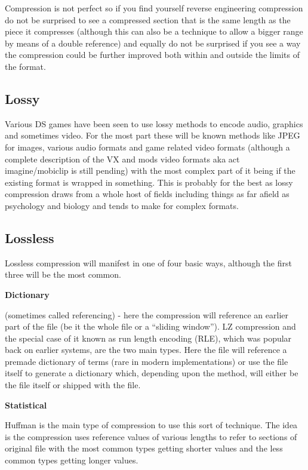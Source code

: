 \documentclass[
]{book}
\begin{document}
Compression is not perfect so if you find yourself reverse engineering compression do not be surprised to see a compressed section that is the same length as the piece it compresses (although this can also be a technique to allow a bigger range by means of a double reference) and equally do not be surprised if you see a way the compression could be further improved both within and outside the limits of the format.

\hypertarget{lossy}{%
\subsection{Lossy}\label{lossy}}

Various DS games have been seen to use lossy methods to encode audio, graphics and sometimes video. For the most part these will be known methods like JPEG for images, various audio formats and game related video formats (although a complete description of the VX and mods video formats aka act imagine/mobiclip is still pending) with the most complex part of it being if the existing format is wrapped in something. This is probably for the best as lossy compression draws from a whole host of fields including things as far afield as psychology and biology and tends to make for complex formats.

\hypertarget{lossless}{%
\subsection{Lossless}\label{lossless}}

Lossless compression will manifest in one of four basic ways, although the first three will be the most common.

\textbf{Dictionary}

(sometimes called referencing) - here the compression will reference an earlier part of the file (be it the whole file or a ``sliding window''). LZ compression and the special case of it known as run length encoding (RLE), which was popular back on earlier systems, are the two main types. Here the file will reference a premade dictionary of terms (rare in modern implementations) or use the file itself to generate a dictionary which, depending upon the method, will either be the file itself or shipped with the file.

\textbf{Statistical}

Huffman is the main type of compression to use this sort of technique. The idea is the compression uses reference values of various lengths to refer to sections of original file with the most common types getting shorter values and the less common types getting longer values.
\end{document}
